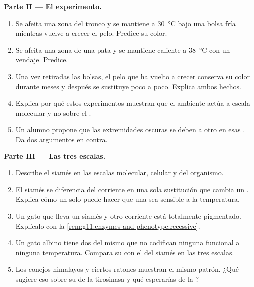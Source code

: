 \begin{problem}
\medskip
\noindent\textbf{Parte II --- El experimento.}
\begin{enumerate}[resume]
  \item Se afeita una zona del tronco y se mantiene a
        \qty{30}{\celsius} bajo una bolsa fría mientras vuelve a crecer
        el pelo. Predice su color.
  \item Se afeita una zona de una pata y se mantiene caliente a
        \qty{38}{\celsius} con un vendaje. Predice.
  \item Una vez retiradas las bolsas, el pelo que ha vuelto a crecer
        conserva su color durante meses y después se sustituye poco a
        poco. Explica ambos hechos.
  \item Explica por qué estos experimentos muestran que el ambiente
        actúa a escala molecular y no sobre el .
  \item Un alumno propone que las extremidades oscuras se deben a otro
         en esas . Da dos argumentos en contra.
\end{enumerate}

\medskip
\noindent\textbf{Parte III --- Las tres escalas.}
\begin{enumerate}[resume]
  \item Describe el  siamés en las escalas molecular, celular y
        del organismo.
  \item El  siamés se diferencia del corriente en una sola
        sustitución que cambia un . Explica cómo un solo
         puede hacer que una  sea sensible a la
        temperatura.
  \item Un gato que lleva un  siamés y otro corriente está
        totalmente pigmentado. Explícalo con la
        \cref{rem:g11:enzymes-and-phenotype:recessive}.
  \item Un gato albino tiene dos  del mismo  que no codifican
        ninguna  funcional a ninguna temperatura. Compara su
         con el del siamés en las tres escalas.
  \item Los conejos himalayos y ciertos ratones muestran el mismo
        patrón. ¿Qué sugiere eso sobre su  de la tirosinasa y qué
        esperarías de la ?
\end{enumerate}


\end{problem}
